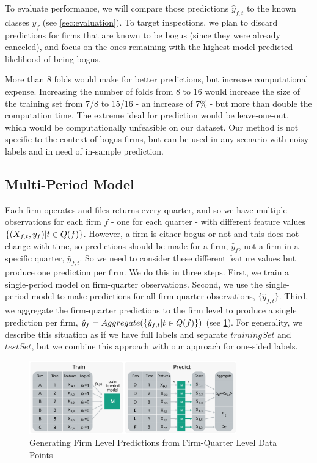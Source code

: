 To evaluate performance, we will compare those predictions $\hat{y}_{f,t}$ to the known classes $y_f$ (see \cref{sec:evaluation}). To target inspections, we plan to discard predictions for firms that are known to be bogus (since they were already canceled), and focus on the ones remaining with the highest model-predicted likelihood of being bogus. 

More than 8 folds would make for better predictions, but increase computational expense. Increasing the number of folds from 8 to 16 would increase the size of the training set from 7/8 to 15/16 - an increase of 7\% - but more than double the computation time. The extreme ideal for prediction would be leave-one-out, which would be computationally unfeasible on our dataset. Our method is not specific to the context of bogus firms, but can be used in any scenario with noisy labels and in need of in-sample prediction. 

\subsection{Multi-Period Model}
\label{subsec:multi-period}
Each firm operates and files returns every quarter, and so we have multiple observations for each firm $f$ - one for each quarter - with different feature values $\{(X_{f,t},y_f)\space | \space t \in Q(f)\}$. However, a firm is either bogus or not and this does not change with time, so predictions should be made for a firm, $\hat{y}_f$, not a firm in a specific quarter, $\hat{y}_{f,t}$. So we need to consider these different feature values but produce one prediction per firm. We do this in three steps. First, we train a single-period model on firm-quarter observations. Second, we use the single-period model to make predictions for all firm-quarter observations, $\{\hat{y}_{f,t}\}$. Third, we aggregate the firm-quarter predictions to the firm level to produce a single prediction per firm, $\hat{y}_f=Aggregate(\{\hat{y}_{f,t}\space|t \in Q(f)\})$ (see \cref{fig:aggregation}). For generality, we describe this situation as if we have full labels and separate $trainingSet$ and $testSet$, but we combine this approach with our approach for one-sided labels.

\begin{figure}[t!]
  \includegraphics[width=0.8\textwidth]{graphs/MultiplePeriodPrediction.png}
  \caption{Generating Firm Level Predictions from Firm-Quarter Level Data Points}
  \label{fig:aggregation}
\end{figure}

